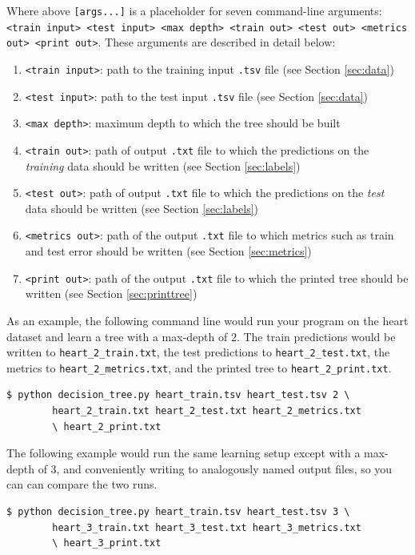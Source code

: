 \documentclass[11pt,addpoints,answers]{exam}
\begin{document}
Where above \lstinline{[args...]} is a placeholder for seven command-line arguments: 
\texttt{<train input> <test input> <max depth> <train out> <test out> <metrics out> <print out>}. These arguments are described in detail below:
\begin{enumerate}
\item \lstinline{<train input>}: path to the training input \lstinline{.tsv} file (see Section \ref{sec:data})
\item \lstinline{<test input>}: path to the test input \lstinline{.tsv} file (see Section \ref{sec:data})
\item \lstinline{<max depth>}: maximum depth to which the tree should be built
\item \lstinline{<train out>}: path of output \lstinline{.txt} file to which the predictions on the \textit{training} data should be written (see Section \ref{sec:labels})
\item \lstinline{<test out>}: path of output \lstinline{.txt} file to which the predictions on the \emph{test} data should be written (see Section \ref{sec:labels})
\item \lstinline{<metrics out>}: path of the output \lstinline{.txt} file to which metrics such as train and test error should be written (see Section \ref{sec:metrics})
\item \lstinline{<print out>}: path of the output \lstinline{.txt} file to which the printed tree should be written (see Section \ref{sec:printtree})
\end{enumerate}

As an example, the following command line would run your program on the heart dataset and learn a tree with a max-depth of 2. The train predictions would be written to \lstinline{heart_2_train.txt}, the test predictions to \lstinline{heart_2_test.txt}, the metrics to \lstinline{heart_2_metrics.txt}, and the printed tree to \lstinline{heart_2_print.txt}.
%
\begin{lstlisting}[language=Shell]
$ python decision_tree.py heart_train.tsv heart_test.tsv 2 \ 
        heart_2_train.txt heart_2_test.txt heart_2_metrics.txt 
        \ heart_2_print.txt
\end{lstlisting}
%
The following example would run the same learning setup except with a max-depth of 3, and conveniently writing to analogously named output files, so you can can compare the two runs.
%
\begin{lstlisting}[language=Shell]
$ python decision_tree.py heart_train.tsv heart_test.tsv 3 \ 
        heart_3_train.txt heart_3_test.txt heart_3_metrics.txt 
        \ heart_3_print.txt
\end{lstlisting}
\end{document}
